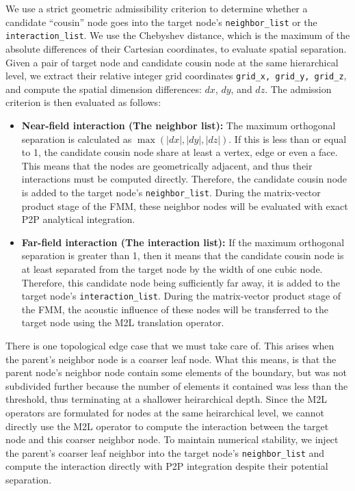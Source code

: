 We use a strict geometric admissibility criterion to determine whether a candidate ``cousin'' node goes into the target node's \texttt{neighbor\_list} or the \texttt{interaction\_list}. 
We use the Chebyshev distance, which is the maximum of the absolute differences of their Cartesian coordinates, to evaluate spatial separation. Given a pair of target node and candidate cousin node at the same hierarchical level, we extract their relative integer grid coordinates \texttt{grid\_x, grid\_y, grid\_z}, and compute the spatial dimension differences: $dx$, $dy$, and $dz$. The admission criterion is then evaluated as follows:
\begin{itemize}
    \item \textbf{Near-field interaction (The neighbor list):} The maximum orthogonal separation is calculated as $\max(|dx|, |dy|, |dz|)$. If this is less than or equal to 1, the candidate cousin node share at least a vertex, edge or even a face. This means that the nodes are geometrically adjacent, and thus their interactions must be computed directly. Therefore, the candidate cousin node is added to the target node's \texttt{neighbor\_list}. During the matrix-vector product stage of the \ac{FMM}, these neighbor nodes will be evaluated with exact \ac{P2P} analytical integration.
    \item \textbf{Far-field interaction (The interaction list):} If the maximum orthogonal separation is greater than 1, then it means that the candidate cousin node is at least separated from the target node by the width of one cubic node. Therefore, this candidate node being sufficiently far away, it is added to the target node's \texttt{interaction\_list}. During the matrix-vector product stage of the \ac{FMM}, the acoustic influence of these nodes will be transferred to the target node using the \ac{M2L} translation operator.
\end{itemize}

There is one topological edge case that we must take care of. This arises when the parent's neighbor node is a coarser leaf node. What this means, is that the parent node's neighbor node contain some elements of the boundary, but was not subdivided further because the number of elements it contained was less than the threshold, thus terminating at a shallower heirarchical depth. Since the \ac{M2L} operators are formulated for nodes at the same heirarchical level, we cannot directly use the \ac{M2L} operator to compute the interaction between the target node and this coarser neighbor node. To maintain numerical stability, we inject the parent's coarser leaf neighbor into the target node's \texttt{neighbor\_list} and compute the interaction directly with \ac{P2P} integration despite their potential separation.


